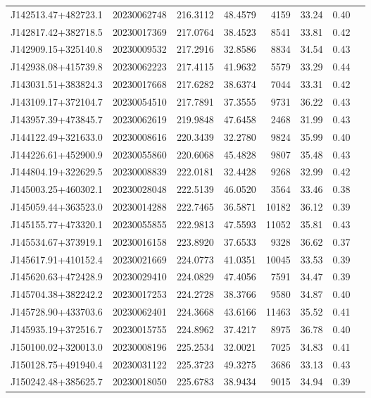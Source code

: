 \documentclass{article}
\begin{document}
\begin {longtable}{|l|l|r|r|r|r|r|l|}
 J142513.47+482723.1&  20230062748&  216.3112&   48.4579&  4159& 33.24& 0.40&\\
 J142817.42+382718.5&  20230017369&  217.0764&   38.4523&  8541& 33.81& 0.42&\\
 J142909.15+325140.8&  20230009532&  217.2916&   32.8586&  8834& 34.54& 0.43&\\
 J142938.08+415739.8&  20230062223&  217.4115&   41.9632&  5579& 33.29& 0.44&\\
 J143031.51+383824.3&  20230017668&  217.6282&   38.6374&  7044& 33.31& 0.42&\\
 J143109.17+372104.7&  20230054510&  217.7891&   37.3555&  9731& 36.22& 0.43&\\
 J143957.39+473845.7&  20230062619&  219.9848&   47.6458&  2468& 31.99& 0.43&\\
 J144122.49+321633.0&  20230008616&  220.3439&   32.2780&  9824& 35.99& 0.40&\\
 J144226.61+452900.9&  20230055860&  220.6068&   45.4828&  9807& 35.48& 0.43&\\
 J144804.19+322629.5&  20230008839&  222.0181&   32.4428&  9268& 32.99& 0.42&\\
 J145003.25+460302.1&  20230028048&  222.5139&   46.0520&  3564& 33.46& 0.38&\\
 J145059.44+363523.0&  20230014288&  222.7465&   36.5871& 10182& 36.12& 0.39&\\
 J145155.77+473320.1&  20230055855&  222.9813&   47.5593& 11052& 35.81& 0.43&\\
 J145534.67+373919.1&  20230016158&  223.8920&   37.6533&  9328& 36.62& 0.37&\\
 J145617.91+410152.4&  20230021669&  224.0773&   41.0351& 10045& 33.53& 0.39&\\
 J145620.63+472428.9&  20230029410&  224.0829&   47.4056&  7591& 34.47& 0.39&\\
 J145704.38+382242.2&  20230017253&  224.2728&   38.3766&  9580& 34.87& 0.40&\\
 J145728.90+433703.6&  20230062401&  224.3668&   43.6166& 11463& 35.52& 0.41&\\
 J145935.19+372516.7&  20230015755&  224.8962&   37.4217&  8975& 36.78& 0.40&\\
 J150100.02+320013.0&  20230008196&  225.2534&   32.0021&  7025& 34.83& 0.41&\\
 J150128.75+491940.4&  20230031122&  225.3723&   49.3275&  3686& 33.13& 0.43&\\
 J150242.48+385625.7&  20230018050&  225.6783&   38.9434&  9015& 34.94& 0.39&\\

\end{longtable}
\end{document}
